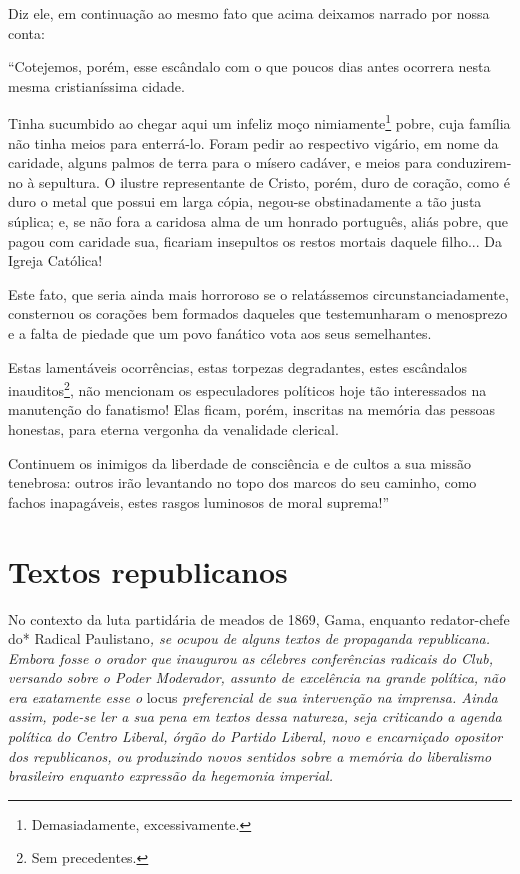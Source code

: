 Diz ele, em continuação ao mesmo fato que acima deixamos narrado por
nossa conta:

``Cotejemos, porém, esse escândalo com o que poucos dias antes ocorrera
nesta mesma cristianíssima cidade.

Tinha sucumbido ao chegar aqui um infeliz moço nimiamente\footnote{Demasiadamente,
  excessivamente.} pobre, cuja família não tinha meios para enterrá-lo.
Foram pedir ao respectivo vigário, em nome da caridade, alguns palmos de
terra para o mísero cadáver, e meios para conduzirem-no à sepultura. O
ilustre representante de Cristo, porém, duro de coração, como é duro o
metal que possui em larga cópia, negou-se obstinadamente a tão justa
súplica; e, se não fora a caridosa alma de um honrado português, aliás
pobre, que pagou com caridade sua, ficariam insepultos os restos mortais
daquele filho... Da Igreja Católica!

Este fato, que seria ainda mais horroroso se o relatássemos
circunstanciadamente, consternou os corações bem formados daqueles que
testemunharam o menosprezo e a falta de piedade que um povo fanático
vota aos seus semelhantes.

Estas lamentáveis ocorrências, estas torpezas degradantes, estes
escândalos inauditos\footnote{Sem precedentes.}, não mencionam os
especuladores políticos hoje tão interessados na manutenção do
fanatismo! Elas ficam, porém, inscritas na memória das pessoas honestas,
para eterna vergonha da venalidade clerical.

Continuem os inimigos da liberdade de consciência e de cultos a sua
missão tenebrosa: outros irão levantando no topo dos marcos do seu
caminho, como fachos inapagáveis, estes rasgos luminosos de moral
suprema!''

\part{Textos republicanos}

\begin{didascalia}
No contexto da luta partidária de meados de 1869, Gama, enquanto
redator-chefe do* Radical Paulistano\emph{, se ocupou de alguns textos
de propaganda republicana. Embora fosse o orador que inaugurou as
célebres conferências radicais do Club, versando sobre o Poder
Moderador, assunto de excelência na grande política, não era exatamente
esse o} locus \emph{preferencial de sua intervenção na imprensa. Ainda
assim, pode-se ler a sua pena em textos dessa natureza, seja criticando
a agenda política do Centro Liberal, órgão do Partido Liberal, novo e
encarniçado opositor dos republicanos, ou produzindo novos sentidos
sobre a memória do liberalismo brasileiro enquanto expressão da
hegemonia imperial.}
\end{didascalia}

